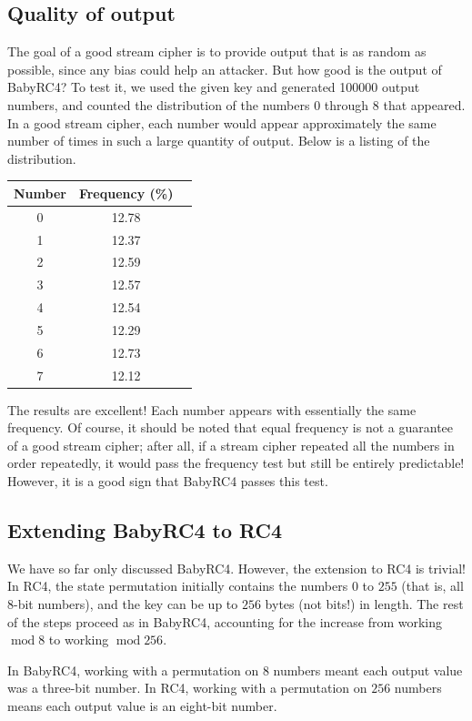 \documentclass{book}
\theoremstyle{plain}
\theoremstyle{definition}
\renewcommand{\mod}{\operatorname{mod}}
\renewcommand{\mod}{\operatorname{mod}}
\begin{document}
\subsection{Quality of output}
The goal of a good stream cipher is to provide output that is as random as possible, since any bias could help an attacker. But how good is the output of BabyRC4? To test it, we used the given key and generated 100000 output numbers, and counted the distribution of the numbers $0$ through $8$ that appeared. In a good stream cipher, each number would appear approximately the same number of times in such a large quantity of output. Below is a listing of the distribution.

\begin{center}
\begin{tabular}{ccc}
Number & Frequency (\%) \\
\hline
0 & 12.78 \\
1 & 12.37 \\
2 & 12.59 \\
3 & 12.57 \\
4 & 12.54 \\
5 & 12.29 \\
6 & 12.73 \\
7 & 12.12
\end{tabular}
\end{center}
The results are excellent! Each number appears with essentially the same frequency. Of course, it should be noted that equal frequency is not a guarantee of a good stream cipher; after all, if a stream cipher repeated all the numbers in order repeatedly, it would pass the frequency test but still be entirely predictable! However, it is a good sign that BabyRC4 passes this test.

\subsection{Extending BabyRC4 to RC4}
We have so far only discussed BabyRC4. However, the extension to RC4 is trivial! In RC4, the state permutation initially contains the numbers $0$ to $255$ (that is, all $8$-bit numbers), and the key can be up to $256$ bytes (not bits!) in length. The rest of the steps proceed as in BabyRC4, accounting for the increase from working $\mod 8$ to working $\mod 256$.

In BabyRC4, working with a permutation on $8$ numbers meant each output value was a three-bit number. In RC4, working with a permutation on $256$ numbers means each output value is an eight-bit number.
\end{document}

